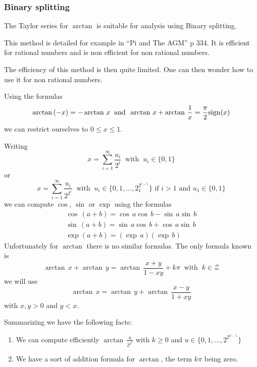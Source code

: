 \documentclass[12pt]{amsart}
\def\Z{{\mathcal Z}}
\begin{document}
\subsubsection{Binary splitting}
\noindent The Taylor series for $\arctan$ is suitable for analysis using Binary splitting.
\par This method is detailed for example in ``Pi and The AGM'' p 334. It is efficient for rational numbers and is non efficient for non rational numbers.
\par The efficiency of this method is then quite limited. One can then wonder how to use it for non rational numbers.
\par Using the formulas
\begin{equation*}
\arctan\,(-x)=-\arctan\,x\;\;\mbox{and}\;\;\arctan\,x+\arctan\,\frac{1}{x}=\frac{\pi}{2}{\rm sign}(x)
\end{equation*}
we can restrict ourselves to $0\leq x\leq 1$.
\par Writing
\begin{equation*}
x=\sum_{i=1}^{\infty} \frac{u_i}{2^i}\;\;\mbox{with}\;\;u_i\in\{0,1\}
\end{equation*}
or
\begin{equation*}
x=\sum_{i=1}^{\infty} \frac{u_i}{2^{2^i}}\;\;\mbox{with}\;\;u_i\in\{0,1,\dots,2^{2^{i-1}}_1\}\mbox{~if~}i>1\mbox{~and~}u_1\in \{0,1\}
\end{equation*}
we can compute $\cos$,  $\sin$ or $\exp$ using the formulas
\begin{equation*}
\begin{array}{c}
\cos\,(a+b)=\cos\,a\cos\,b-\sin\,a\sin\,b\\
\sin\,(a+b)=\sin\,a\cos\,b+\cos\,a\sin\,b\\
\exp(a+b)=(\exp\,a)(\exp\,b)
\end{array}
\end{equation*}
Unfortunately for $\arctan$ there is no similar formulas. The only formula known is
\begin{equation*}
\arctan\,x+\arctan\,y=\arctan\,\frac{x+y}{1-xy}+k\pi\;\;\mbox{with}\;\;k\in\Z
\end{equation*}
we will use
\begin{equation*}
\arctan\,x=\arctan\,y+\arctan\,\frac{x-y}{1+xy}
\end{equation*}
with $x,y>0$ and $y<x$.
\par Summarizing we have the following facts:
\begin{enumerate}
\item We can compute efficiently $\arctan\,\frac{u}{2^{2^k}}$ with $k\geq 0$ and $u\in\{0,1,\dots,2^{2^{k-1}}\}$
\item We have a sort of addition formula for $\arctan$, the term $k\pi$ being zero.
\end{enumerate}
\end{document}
